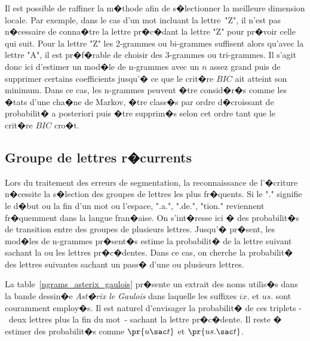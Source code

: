 
Il est possible de raffiner la m�thode afin de s�lectionner la meilleure dimension locale. Par exemple, dans le cas d'un mot incluant la lettre~"Z", il n'est pas n�cessaire de conna�tre la lettre pr�c�dant la lettre "Z" pour pr�voir celle qui suit. Pour la lettre "Z" les 2-grammes ou bi-grammes suffisent alors qu'avec la lettre "A", il est pr�f�rable de choisir des 3-grammes ou tri-grammes. Il s'agit donc ici d'estimer un mod�le de n-grammes avec un $n$ assez grand puis de supprimer certains coefficients jusqu'� ce que le crit�re $BIC$ ait atteint son minimum. Dans ce cas, les n-grammes peuvent �tre consid�r�s comme les �tats d'une cha�ne de Markov, �tre class�s par ordre d�croissant de probabilit� a posteriori puis �tre supprim�s selon cet ordre tant que le crit�re $BIC$ cro�t.








\subsection{Groupe de lettres r�currents}

Lors du traitement des erreurs de segmentation, la reconnaissance de l'�criture n�cessite la s�lection des groupes de lettres les plus fr�quents. Si le "." signifie le d�but ou la fin d'un mot ou l'espace, ".a.", ".de.", "tion." reviennent fr�quemment dans la langue fran�aise. On s'int�resse ici � des probabilit�s de transition entre des groupes de plusieurs lettres. Jusqu'� pr�sent, les mod�les de n-grammes pr�sent�s estime la probabilit� de la lettre suivant sachant la ou les lettres pr�c�dentes. Dans ce cas, on cherche la probabilit� des lettres suivantes sachant un pass� d'une ou plusieurs lettres.

        

La table~\ref{ngrams_asterix_gaulois} pr�sente un extrait des noms utilis�s dans la bande dessin�e \textit{Ast�rix le Gaulois} dans laquelle les suffixes $ix.$ et $us.$ sont couramment employ�s. Il est naturel d'envisager la probabilit� de ces triplets -~deux lettres plus la fin du mot~- sachant la lettre pr�c�dente. Il reste � estimer des probabilit�s comme $\pr{ u \sac t}$ et $ \pr{ us. \sac t }$. 


